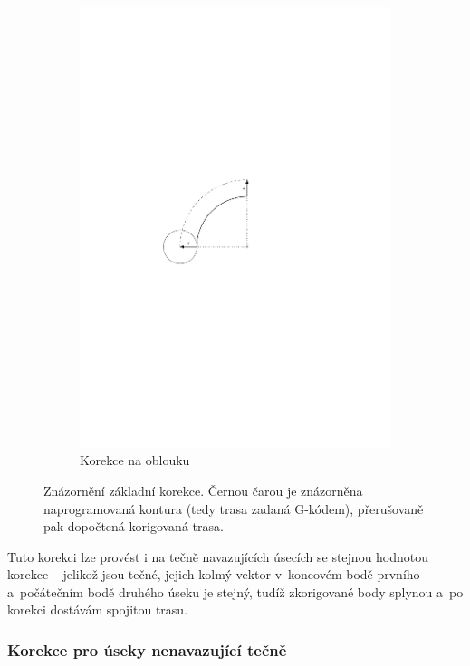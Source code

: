 \begin{figure}[h]
\begin{subfigure}[b]{0.25\textwidth}
						\includegraphics[width=\textwidth]{img/korekce-kruh-jedn.pdf}
						\caption{Korekce na oblouku}
					\end{subfigure}
					\caption{Znázornění základní korekce. Černou čarou je znázorněna naprogramovaná kontura (tedy trasa zadaná G-kódem), přerušovaně pak dopočtená korigovaná trasa.}\label{obr:kor-zak}
			\end{figure}
			Tuto korekci lze provést i na tečně navazujících úsecích se stejnou hodnotou korekce -- jelikož jsou tečné, jejich kolmý vektor v~koncovém bodě prvního a~počátečním bodě druhého úseku je stejný, tudíž zkorigované body splynou a~po korekci dostávám spojitou trasu.
			
			\subsubsection{Korekce pro úseky nenavazující tečně}
			
